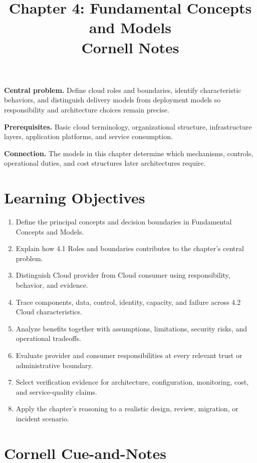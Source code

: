 \documentclass[11pt]{article}
\title{Chapter 4: Fundamental Concepts and Models\\[2mm]\large Cornell Notes}
\author{}
\date{}
\begin{document}
\maketitle
\thispagestyle{fancy}
\vspace{-1.5em}
\begin{orientationbox}
\textbf{Central problem.} Define cloud roles and boundaries, identify characteristic behaviors, and distinguish delivery models from deployment models so responsibility and architecture choices remain precise.\par\smallskip
\textbf{Prerequisites.} Basic cloud terminology, organizational structure, infrastructure layers, application platforms, and service consumption.\par\smallskip
\textbf{Connection.} The models in this chapter determine which mechanisms, controls, operational duties, and cost structures later architectures require.
\end{orientationbox}
\section{Learning Objectives}
\begin{enumerate}
\item Define the principal concepts and decision boundaries in Fundamental Concepts and Models.
\item Explain how 4.1 Roles and boundaries contributes to the chapter's central problem.
\item Distinguish Cloud provider from Cloud consumer using responsibility, behavior, and evidence.
\item Trace components, data, control, identity, capacity, and failure across 4.2 Cloud characteristics.
\item Analyze benefits together with assumptions, limitations, security risks, and operational tradeoffs.
\item Evaluate provider and consumer responsibilities at every relevant trust or administrative boundary.
\item Select verification evidence for architecture, configuration, monitoring, cost, and service-quality claims.
\item Apply the chapter's reasoning to a realistic design, review, migration, or incident scenario.
\end{enumerate}
\section{Cornell Cue-and-Notes}
\end{document}
